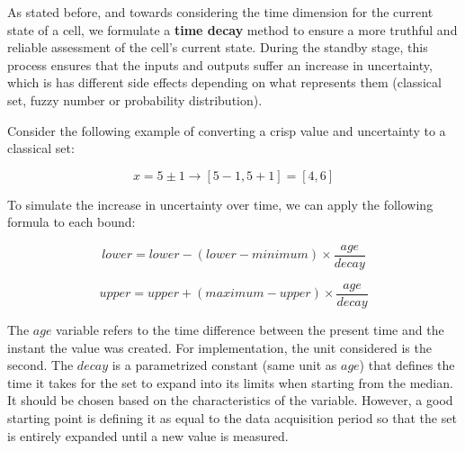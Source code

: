 As stated before, and towards considering the time dimension for the current state of a cell, we formulate a \textbf{time decay} method to ensure a more truthful and reliable assessment of the cell's current state. During the standby stage, this process ensures that the inputs and outputs suffer an increase in uncertainty, which is has different side effects depending on what represents them (classical set, fuzzy number or probability distribution).

Consider the following example of converting a crisp value and uncertainty to a classical set:

$$x = 5 \pm 1 \rightarrow [5-1, 5+1] = [4, 6]$$

To simulate the increase in uncertainty over time, we can apply the following formula to each bound:

\begin{equation}
lower = lower - (lower - minimum) \times \frac{age}{decay}
\end{equation}

\begin{equation}
upper = upper + (maximum - upper) \times \frac{age}{decay}
\end{equation}

The $age$ variable refers to the time difference between the present time and the instant the value was created. For implementation, the unit considered is the second. The $decay$ is a parametrized constant (same unit as $age$) that defines the time it takes for the set to expand into its limits when starting from the median. It should be chosen based on the characteristics of the variable. However, a good starting point is defining it as equal to the data acquisition period so that the set is entirely expanded until a new value is measured.

